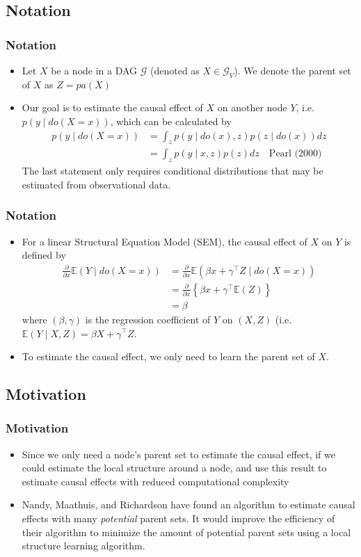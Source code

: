 \documentclass{beamer}
\begin{document}
\subsection{Notation}
\begin{frame}
\frametitle{Notation}
\begin{itemize}
\item Let $X$ be a node in a DAG $\mathcal{G}$ (denoted as $X \in \mathcal{G}_V$). We denote the parent set of $X$ as $Z = pa(X)$
\item Our goal is to estimate the causal effect of $X$ on another node $Y$, i.e. $p(y \mid do(X=x))$, which can be calculated by
\begin{align*}
p(y \mid do(X=x)) &= \int_z p(y \mid do(x),z)p(z \mid do(x)) dz \\
&= \int_z p(y \mid x,z)p(z) dz \quad \textrm{Pearl (2000)}
\end{align*}
The last statement only requires conditional distributions that may be estimated from observational data.
\end{itemize}
\end{frame}

\begin{frame}
\frametitle{Notation}
\begin{itemize}
\item For a linear Structural Equation Model (SEM), the causal effect of $X$ on $Y$ is defined by
\begin{align*}
\frac{\partial}{\partial x} \mathbb{E}(Y \mid do(X=x)) &= \frac{\partial}{\partial x} \mathbb{E}(\beta x + \gamma^\top Z \mid do(X=x)) \\
&= \frac{\partial}{\partial x} \left\{ \beta x + \gamma^\top \mathbb{E}(Z) \right\}  \\
&= \beta
\end{align*}
where $(\beta,\gamma)$ is the regression coefficient of $Y$ on $(X,Z)$ (i.e. $\mathbb{E}(Y \mid X,Z) = \beta X + \gamma^\top Z$.
\item To estimate the causal effect, we only need to learn the parent set of $X$.
\end{itemize}

\end{frame}

\subsection{Motivation}

\begin{frame}
\frametitle{Motivation}
\begin{itemize}
\item Since we only need a node's parent set to estimate the causal effect, if we could estimate the local structure around a node, and use this result to estimate causal effects with reduced computational complexity
\item Nandy, Maathuis, and Richardson have found an algorithm to estimate causal effects with many \textit{potential} parent sets. It would improve the efficiency of their algorithm to minimize the amount of potential parent sets using a local structure learning algorithm. 
\end{itemize}
\end{frame}
\end{document}
